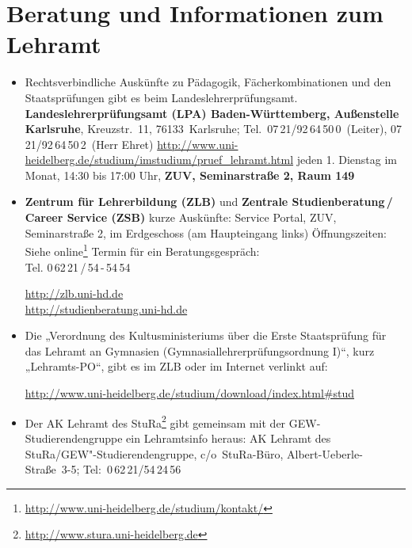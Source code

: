 \section{Beratung und Informationen zum Lehramt}
\begin{itemize}
\item Rechtsverbindliche Auskünfte zu Pädagogik, Fächerkombinationen und
      den Staatsprüfungen gibt es beim Landeslehrerprüfungsamt. \newline
      \textbf{Landeslehrerprüfungsamt (LPA) Baden-Württemberg,
           Außenstelle Karlsruhe},
      Kreuzstr.~11, 76133~Karlsruhe; \newline
Tel.~07\,21/92\,64\,50\,0~(Leiter), 07\,21/92\,64\,50\,2~(Herr Ehret) \newline
      \url{http://www.uni-heidelberg.de/studium/imstudium/pruef_lehramt.html} \newline
      jeden 1. Dienstag im Monat, 14:30 bis 17:00 Uhr,
      \textbf{\gls{ZUV}, Seminarstraße 2, Raum 149}


\item \textbf{Zentrum für Lehrerbildung (ZLB)} und \textbf{Zentrale Studienberatung\,/\,Career Service (ZSB)} \newline
      kurze Auskünfte: Service Portal, \gls{ZUV}, Seminarstraße 2, im Erdgeschoss (am Haupteingang links)
      Öffnungszeiten: Siehe online\footnote{\url{http://www.uni-heidelberg.de/studium/kontakt/}} \newline
      Termin für ein Beratungsgespräch: \\ Tel. 0\,62\,21\,/\,54\,-\,54\,54

      \url{http://zlb.uni-hd.de}\\
      \url{http://studienberatung.uni-hd.de}

\item Die „Verordnung des Kultusministeriums über die Erste Staatsprüfung für das Lehramt an Gymnasien (Gymnasiallehrerprüfungsordnung I)“, kurz „Lehramts-PO“, gibt es im ZLB oder im Internet verlinkt auf:

      \url{http://www.uni-heidelberg.de/studium/download/index.html#stud}


\item Der AK Lehramt des StuRa\footnote{\url{http://www.stura.uni-heidelberg.de}} gibt gemeinsam mit der  GEW-Stu\-dier\-en\-den\-grup\-pe ein Lehramtsinfo heraus: \newline AK Lehramt des StuRa/GEW"-Studierendengruppe, c/o~StuRa-Büro, Albert-Ueberle-Straße~3-5; Tel:~0\,62\,21/54\,24\,56


\end{itemize}
